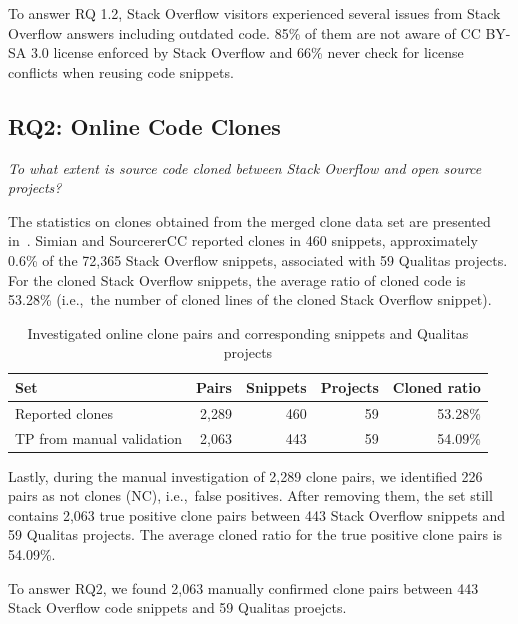 \documentclass[10pt,journal,compsoc]{IEEEtran}
\newenvironment{boxquote}{\vspace{-1ex}\setlength{\FrameSep}{1\fboxsep}\begin{framed}\setlength{\parskip}{0.5\baselineskip}\setlength{\parindent}{0pt}}{\end{framed}}
\begin{document}
\begin{boxquote}
	To answer RQ 1.2, Stack Overflow visitors experienced several issues from Stack
Overflow answers including outdated code. 85\% of them are not aware of
CC BY-SA 3.0 license enforced by Stack Overflow and 66\% never check for license
conflicts when reusing code snippets.
\end{boxquote}

\subsection{RQ2: Online Code Clones} 
\vspace{0.25cm}
\textit{To what extent is source
	code cloned between Stack Overflow and open source projects?}
\vspace{0.25cm}

The statistics on clones obtained from the merged clone data set are
presented in~. Simian and SourcererCC
reported clones in 460 snippets, approximately 0.6\% of the
72,365 Stack Overflow snippets, associated with 59 Qualitas
projects. For the cloned Stack Overflow snippets, the
average ratio of cloned code is 53.28\% (i.e.,\ the number of cloned
lines of the cloned Stack Overflow snippet).

\begin{table}
	\caption{Investigated online clone pairs and corresponding snippets
		and Qualitas projects}
	\label{tab:snippets}
	\centering
	\begin{tabular}{p{2.2cm}rrrr}
		\toprule
		Set & Pairs & Snippets & Projects & Cloned ratio \\
		\midrule
		Reported clones & 2,289 & 460 & 59 & 53.28\% \\ 
		\midrule
		TP from manual validation & 2,063 & 443 & 59 & 54.09\% \\ 
		\bottomrule
	\end{tabular}
\end{table}

Lastly, during the manual investigation of 2,289 clone pairs, we identified 226 pairs
as not clones (NC), i.e.,~false positives. After removing
them, the set still contains 2,063 true positive clone pairs between 443 Stack
Overflow snippets and 59 Qualitas projects. The average cloned ratio for the
true positive clone pairs is 54.09\%.

\begin{boxquote}
	To answer RQ2, we found 2,063 manually confirmed clone pairs between 443 Stack Overflow code snippets
	and 59 Qualitas proejcts. 
\end{boxquote}
\end{document}
